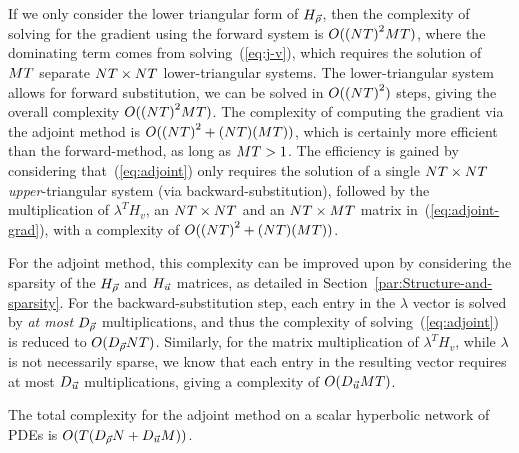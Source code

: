 If we only consider the lower triangular form of $H_{\vec{\rho}}$, then the
complexity of solving for the gradient using the forward system is
$O(\left(\nlinks\ntime\right)^{2}\ncontrols\ntime)$, where the dominating
term comes from solving~(\ref{eq:j-v}), which requires the solution
of $MT$ separate $NT\times NT$
lower-triangular systems. The lower-triangular system allows for forward
substitution, we can be solved in $O(\left(\nlinks\ntime\right)^{2})$
steps, giving the overall complexity $O(\left(\nlinks\ntime\right)^{2}\ncontrols\ntime)$.
The complexity of computing the gradient via the adjoint method is
$O(\left(\nlinks\ntime\right)^{2}+\left(\nlinks\ntime\right)\left(\ncontrols\ntime\right))$,
which is certainly more efficient than the forward-method, as long
as $MT>1$. The efficiency is gained by considering
that~(\ref{eq:adjoint}) only requires the solution of a single $NT\times NT$
\emph{upper}-triangular system (via backward-substitution), followed
by the multiplication of $\lambda^{T}H_{v}$, an $NT\times NT$
and an $NT\times MT$ matrix in~(\ref{eq:adjoint-grad}),
with a complexity of $O(\left(\nlinks\ntime\right)^{2}+\left(\nlinks\ntime\right)\left(\ncontrols\ntime\right))$.

For the adjoint method, this complexity can be improved upon by considering
the sparsity of the $H_{\vec{\rho}}$ and $H_{\vec{u}}$ matrices, as detailed in Section~\ref{par:Structure-and-sparsity}.
For the backward-substitution step, each entry in the $\lambda$ vector
is solved by \emph{at most} $D_{\vec{\rho}}$ multiplications, and
thus the complexity of solving~(\ref{eq:adjoint}) is reduced to
$O(D_{\vec{\rho}}NT)$. Similarly, for the matrix multiplication
of $\lambda^{T}H_{v}$, while $\lambda$ is not necessarily sparse,
we know that each entry in the resulting vector requires at most $D_{\vec{u}}$
multiplications, giving a complexity of $O(D_{\vec{u}}MT)$. 
\begin{prop}
\textup{The total complexity for the adjoint method on a scalar hyperbolic
network of PDEs is }$O(\ntime\left(\degree{\state}\nlinks+\degree{\control}\ncontrols\right))$.\end{prop}

